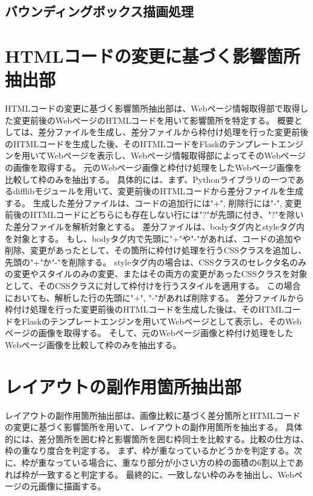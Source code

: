 \subsection{バウンディングボックス描画処理}\label{subsec:Bounding box drawing process}



\section{HTMLコードの変更に基づく影響箇所抽出部}\label{sec:Affected_area_extraction}
HTMLコードの変更に基づく影響箇所抽出部は、Webページ情報取得部で取得した変更前後のWebページのHTMLコードを用いて影響箇所を特定する。
概要としては、差分ファイルを生成し、差分ファイルから枠付け処理を行った変更前後のHTMLコードを生成した後、そのHTMLコードをFlaskのテンプレートエンジンを用いてWebページを表示し、Webページ情報取得部によってそのWebページの画像を取得する。
元のWebページ画像と枠付け処理をしたWebページ画像を比較して枠のみを抽出する。
具体的には、まず、Pythonライブラリの一つであるdifflibモジュールを用いて、変更前後のHTMLコードから差分ファイルを生成する。
生成した差分ファイルは、コードの追加行には"+", 削除行には"-", 変更前後のHTMLコードにどちらにも存在しない行には"?"が先頭に付き、"?"を除いた差分ファイルを解析対象とする。
差分ファイルは、bodyタグ内とstyleタグ内を対象とする。
もし、bodyタグ内で先頭に"+"や"-"があれば、コードの追加や削除、変更があったとして、その箇所に枠付け処理を行うCSSクラスを追加し、先頭の"+"か"-"を削除する。
styleタグ内の場合は、CSSクラスのセレクタ名のみの変更やスタイルのみの変更、またはその両方の変更があったCSSクラスを対象として、そのCSSクラスに対して枠付けを行うスタイルを適用する。
この場合においても、解析した行の先頭に"+", "-"があれば削除する。
差分ファイルから枠付け処理を行った変更前後のHTMLコードを生成した後は、そのHTMLコードをFlaskのテンプレートエンジンを用いてWebページとして表示し、そのWebページの画像を取得する。
そして、元のWebページ画像と枠付け処理をしたWebページ画像を比較して枠のみを抽出する。

\section{レイアウトの副作用箇所抽出部}\label{sec:Layout_subEffect_extraction_section}
レイアウトの副作用箇所抽出部は、画像比較に基づく差分箇所とHTMLコードの変更に基づく影響箇所を用いて、レイアウトの副作用箇所を抽出する。
具体的には、差分箇所を囲む枠と影響箇所を囲む枠同士を比較する。比較の仕方は、枠の重なり度合を判定する。
まず、枠が重なっているかどうかを判定する。次に、枠が重なっている場合に、重なり部分が小さい方の枠の面積の6割以上であれば枠が一致すると判定する。
最終的に、一致しない枠のみを抽出し、Webページの元画像に描画する。


